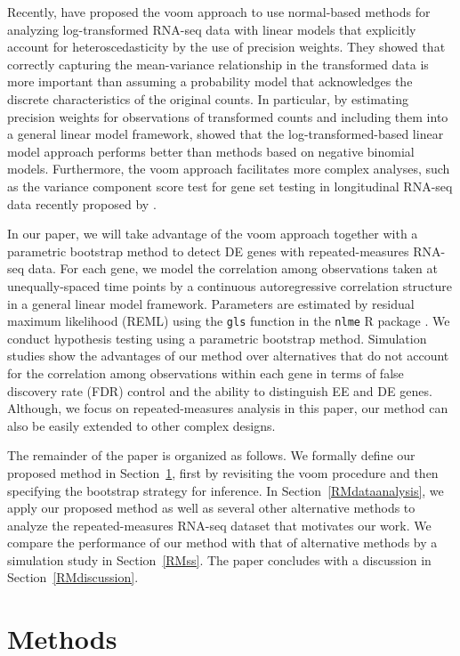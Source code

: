 Recently, \citet{law2014} have  proposed the voom approach to use normal-based methods for analyzing log-transformed RNA-seq data with linear models that explicitly account for heteroscedasticity by the use of precision weights. They showed that correctly capturing the mean-variance relationship in the transformed data is more important than assuming a probability model that acknowledges  the discrete characteristics of the original counts. In particular, by estimating precision weights for  observations of transformed counts and including them into a general linear model framework, \citet{law2014} showed that the log-transformed-based linear model approach performs better than methods based on negative binomial models. Furthermore,  the voom approach facilitates more complex analyses, such as the variance component score test for gene set testing in longitudinal RNA-seq data recently proposed by \cite{angiel2017}. 

In our paper, we will take advantage of the voom approach together with a parametric bootstrap method to detect DE genes with repeated-measures RNA-seq data. For each gene, we model the correlation among observations taken at unequally-spaced time points by a continuous autoregressive correlation structure in a general linear model framework. Parameters are estimated by residual maximum likelihood (REML) using the \texttt{gls} function in the \texttt{nlme} R package \citep{Pinheiro2017R}. We conduct hypothesis testing using a parametric bootstrap method. Simulation studies show the advantages of our method over alternatives that do not account for the correlation among observations within each gene in terms of false discovery rate (FDR) control and the ability to distinguish EE and DE genes. Although, we focus on repeated-measures analysis in this paper, our method can also be easily extended to other complex designs. 

The remainder of the paper is organized as follows. We formally define our proposed method in Section~\ref{RMmethod}, first by revisiting the voom procedure and then specifying the bootstrap strategy for inference. In Section~\ref{RMdataanalysis}, we apply our proposed method as well as several other alternative methods to analyze the repeated-measures RNA-seq dataset that motivates our work. 
We compare the performance of our method with that of alternative methods by a simulation study in  Section~\ref{RMss}. The paper concludes with a discussion in Section~\ref{RMdiscussion}.


\section{Methods}\label{RMmethod}

